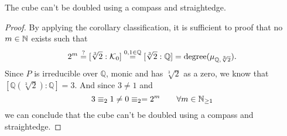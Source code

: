 \begin{frame}
    \begin{theorem}
        \label{thm:third_root_of_two_not_in_M_inf}
        \leanok
        The cube can't be doubled using a compass and straightedge.
    \end{theorem}
    \begin{proof}
        \leanok
        By applying the corollary classification, it is sufficient to proof that no $m\in \mathbb{N}$ exists such that
        $$2^m\overset{?}{=}[\sqrt[3]{2}:\mathcal{K}_0]\overset{0,1\in\mathbb{Q}}{=} [\sqrt[3]{2}:\mathbb{Q}] = \text{degree}(\mu_{\mathbb{Q},\sqrt[3]{2}}).$$
        Since $P$ is irreducible over $\mathbb{Q}$, monic and has $\sqrt[3]{2}$ as a zero, we know that $[\mathbb{Q}(\sqrt[3]{2}):\mathbb{Q}] = 3$.
        And since $3 \ne 1$ and  $$ 3  \equiv_2 1 \neq 0  \equiv_2 = 2^m \qquad\forall m \in \mathbb{N}_{\ge 1}$$
        we can conclude that the cube can't be doubled using a compass and straightedge.
        
    \end{proof}
\end{frame}

